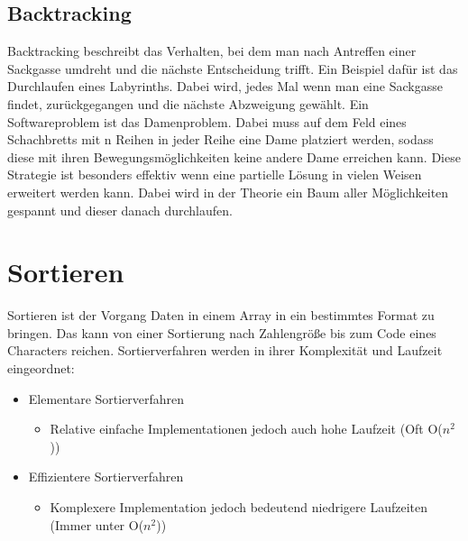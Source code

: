 \documentclass{article}
\begin{document}
	\subsection{Backtracking}
	Backtracking beschreibt das Verhalten, bei dem man nach Antreffen einer Sackgasse umdreht und die nächste Entscheidung trifft. Ein Beispiel dafür ist das Durchlaufen eines Labyrinths. Dabei wird, jedes Mal wenn man eine Sackgasse findet, zurückgegangen und die nächste Abzweigung gewählt. Ein Softwareproblem ist das Damenproblem. Dabei muss auf dem Feld eines Schachbretts mit n Reihen in jeder Reihe eine Dame platziert werden, sodass diese mit ihren Bewegungsmöglichkeiten keine andere Dame erreichen kann. Diese Strategie ist besonders effektiv wenn eine partielle Lösung in vielen Weisen erweitert werden kann. Dabei wird in der Theorie ein Baum aller Möglichkeiten gespannt und dieser danach durchlaufen.
	\section{Sortieren}
	Sortieren ist der Vorgang Daten in einem Array in ein bestimmtes Format zu bringen. Das kann von einer Sortierung nach Zahlengröße bis zum Code eines Characters reichen. Sortierverfahren werden in ihrer Komplexität und Laufzeit eingeordnet:
	\begin{itemize}
		\item{Elementare Sortierverfahren}
		\begin{itemize}
			\item{Relative einfache Implementationen jedoch auch hohe Laufzeit (Oft O($n^2$))}
		\end{itemize}
		\item{Effizientere Sortierverfahren}
		\begin{itemize}
			\item{Komplexere Implementation jedoch bedeutend niedrigere Laufzeiten (Immer unter O($n^2$))}
		\end{itemize}
	\end{itemize}
\end{document}
